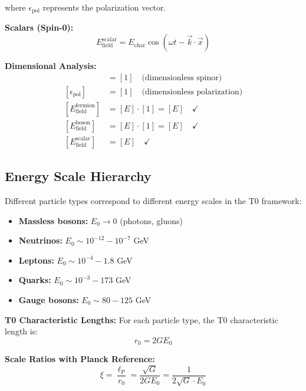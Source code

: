 \documentclass[12pt,a4paper]{report}
\newcommand{\lP}{\ell_{\text{P}}}         %
\newcommand{\rzero}{r_0}                  %
\begin{document}
	where $\epsilon_{\text{pol}}$ represents the polarization vector.
	
	\textbf{Scalars (Spin-0):}
	\begin{equation}
		E_{\text{field}}^{\text{scalar}} = E_{\text{char}} \cos(\omega t - \vec{k} \cdot \vec{x})
	\end{equation}
	
	\textbf{Dimensional Analysis:}
	\begin{align}
		[\xi_{\text{spin}}] &= [1] \quad \text{(dimensionless spinor)} \\
		[\epsilon_{\text{pol}}] &= [1] \quad \text{(dimensionless polarization)} \\
		[E_{\text{field}}^{\text{fermion}}] &= [E] \cdot [1] = [E] \quad \checkmark \\
		[E_{\text{field}}^{\text{boson}}] &= [E] \cdot [1] = [E] \quad \checkmark \\
		[E_{\text{field}}^{\text{scalar}}] &= [E] \quad \checkmark
	\end{align}
	
	\subsection{Energy Scale Hierarchy}
	\label{subsec:energy_scale_hierarchy}
	
	Different particle types correspond to different energy scales in the T0 framework:
	
	\begin{itemize}
		\item \textbf{Massless bosons:} $E_0 \rightarrow 0$ (photons, gluons)
		\item \textbf{Neutrinos:} $E_0 \sim 10^{-12} - 10^{-7}$ GeV
		\item \textbf{Leptons:} $E_0 \sim 10^{-4} - 1.8$ GeV
		\item \textbf{Quarks:} $E_0 \sim 10^{-3} - 173$ GeV
		\item \textbf{Gauge bosons:} $E_0 \sim 80 - 125$ GeV
	\end{itemize}
	
	\textbf{T0 Characteristic Lengths:}
	For each particle type, the T0 characteristic length is:
	\begin{equation}
		\rzero = 2GE_0
	\end{equation}
	
	\textbf{Scale Ratios with Planck Reference:}
	\begin{equation}
		\xi = \frac{\lP}{\rzero} = \frac{\sqrt{G}}{2GE_0} = \frac{1}{2\sqrt{G} \cdot E_0}
	\end{equation}
	
\end{document}
